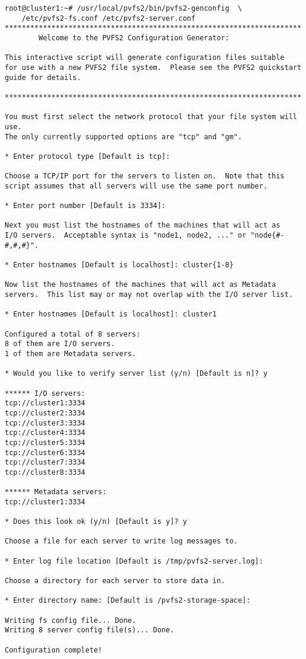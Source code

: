\documentclass[11pt, letterpaper]{article}
\begin{document}
\begin{verbatim}
root@cluster1:~# /usr/local/pvfs2/bin/pvfs2-genconfig  \
	/etc/pvfs2-fs.conf /etc/pvfs2-server.conf
**********************************************************************
        Welcome to the PVFS2 Configuration Generator:

This interactive script will generate configuration files suitable
for use with a new PVFS2 file system.  Please see the PVFS2 quickstart
guide for details.

**********************************************************************

You must first select the network protocol that your file system will use.
The only currently supported options are "tcp" and "gm".

* Enter protocol type [Default is tcp]:

Choose a TCP/IP port for the servers to listen on.  Note that this
script assumes that all servers will use the same port number.

* Enter port number [Default is 3334]: 

Next you must list the hostnames of the machines that will act as
I/O servers.  Acceptable syntax is "node1, node2, ..." or "node{#-#,#,#}".

* Enter hostnames [Default is localhost]: cluster{1-8}

Now list the hostnames of the machines that will act as Metadata
servers.  This list may or may not overlap with the I/O server list.

* Enter hostnames [Default is localhost]: cluster1

Configured a total of 8 servers:
8 of them are I/O servers.
1 of them are Metadata servers.

* Would you like to verify server list (y/n) [Default is n]? y

****** I/O servers:
tcp://cluster1:3334
tcp://cluster2:3334
tcp://cluster3:3334
tcp://cluster4:3334
tcp://cluster5:3334
tcp://cluster6:3334
tcp://cluster7:3334
tcp://cluster8:3334

****** Metadata servers:
tcp://cluster1:3334

* Does this look ok (y/n) [Default is y]? y

Choose a file for each server to write log messages to.

* Enter log file location [Default is /tmp/pvfs2-server.log]: 

Choose a directory for each server to store data in.

* Enter directory name: [Default is /pvfs2-storage-space]: 

Writing fs config file... Done.
Writing 8 server config file(s)... Done.

Configuration complete!
\end{verbatim}
\end{document}
